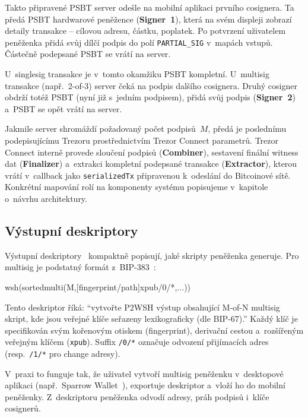 Takto připravené PSBT server odešle na mobilní aplikaci prvního
cosignera. Ta předá PSBT hardwarové peněžence (\textbf{Signer~1}),
která na svém displeji zobrazí detaily transakce -- cílovou adresu,
částku, poplatek. Po potvrzení uživatelem peněženka přidá svůj dílčí
podpis do polí \texttt{PARTIAL\_SIG} v~mapách vstupů. Částečně podepsané
PSBT se vrátí na server.

U~singlesig transakce je v~tomto okamžiku PSBT kompletní. U~multisig
transakce (např.\ 2-of-3) server čeká na podpis dalšího cosignera.
Druhý cosigner obdrží totéž PSBT (nyní již s~jedním podpisem), přidá
svůj podpis (\textbf{Signer~2}) a~PSBT se opět vrátí na server.

Jakmile server shromáždí požadovaný počet podpisů~$M$, předá je
poslednímu podepisujícímu Trezoru prostřednictvím Trezor Connect
parametrů. Trezor Connect interně provede sloučení podpisů
(\textbf{Combiner}), sestavení finální witness dat (\textbf{Finalizer})
a~extrakci kompletní podepsané transakce (\textbf{Extractor}),
kterou vrátí v~callback jako \texttt{serializedTx} připravenou
k~odeslání do Bitcoinové sítě.
Konkrétní mapování rolí na komponenty
systému popisujeme v~kapitole o~návrhu architektury.

\subsection{Výstupní deskriptory}
\label{sec:descriptors}

Výstupní deskriptory~\citep{BIP380} kompaktně popisují, jaké skripty
peněženka generuje. Pro multisig je podstatný formát z~BIP-383~\citep{BIP383}:

\begin{code}
wsh(sortedmulti(M,[fingerprint/path]xpub/0/*,...))
\end{code}

Tento deskriptor říká: \enquote{vytvořte P2WSH výstup obsahující M-of-N multisig
skript, kde jsou veřejné klíče seřazeny lexikograficky (dle BIP-67).} Každý
klíč je specifikován svým kořenovým otiskem (fingerprint), derivační cestou
a~rozšířeným veřejným klíčem (\texttt{xpub}). Suffix \texttt{/0/*} označuje
odvození přijímacích adres (resp.\ \texttt{/1/*} pro change adresy).

V~praxi to funguje tak, že uživatel vytvoří multisig peněženku
v~desktopové aplikaci (např.\ Sparrow Wallet~\citep{SparrowWallet}),
exportuje deskriptor a~vloží ho do mobilní peněženky. Z~deskriptoru
peněženka odvodí adresy, práh podpisů i~klíče cosignerů.


